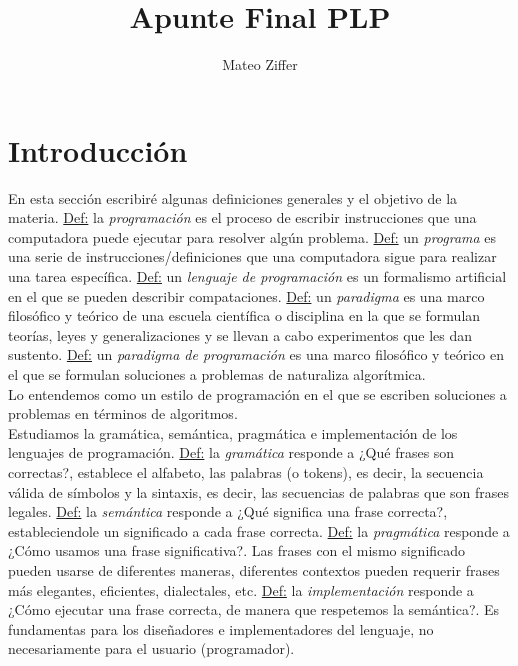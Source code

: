 \documentclass[12pt]{extarticle}
\author{Mateo Ziffer}
\title{Apunte Final PLP}
\def\definicion{\newline\underline{Def:} }
\begin{document}
\maketitle{}
\tableofcontents
\newpage \section{Introducción}
En esta sección escribiré algunas definiciones generales y el objetivo de la materia.
\definicion la \textit{programación} es el proceso de escribir instrucciones que una computadora puede ejecutar para resolver algún problema.
\definicion un \textit{programa} es una serie de instrucciones/definiciones que una computadora sigue para realizar una tarea específica.
\definicion un \textit{lenguaje de programación} es un formalismo artificial en el que se pueden describir compataciones.
\definicion un \textit{paradigma} es una marco filosófico y teórico de una escuela científica o disciplina en la que se formulan teorías, leyes y generalizaciones y se llevan a cabo experimentos que les dan sustento.
\definicion un \textit{paradigma de programación} es una marco filosófico y teórico en el que se formulan soluciones a problemas de naturaliza algorítmica. \\
Lo entendemos como un estilo de programación en el que se escriben soluciones a problemas en términos de algoritmos. \\

Estudiamos la gramática, semántica, pragmática e implementación de los lenguajes de programación.
\definicion la \textit{gramática} responde a ¿Qué frases son correctas?, establece el alfabeto, las palabras (o tokens), es decir, la secuencia válida de símbolos y la sintaxis, es decir, las secuencias de palabras que son frases legales.
\definicion la \textit{semántica} responde a ¿Qué significa una frase correcta?, estableciendole un significado a cada frase correcta.
\definicion la \textit{pragmática} responde a ¿Cómo usamos una frase significativa?. Las frases con el mismo significado pueden usarse de diferentes maneras, diferentes contextos pueden requerir frases más elegantes, eficientes, dialectales, etc.
\definicion la \textit{implementación} responde a ¿Cómo ejecutar una frase correcta, de manera que respetemos la semántica?. Es fundamentas para los diseñadores e implementadores del lenguaje, no necesariamente para el usuario (programador).
\end{document}
